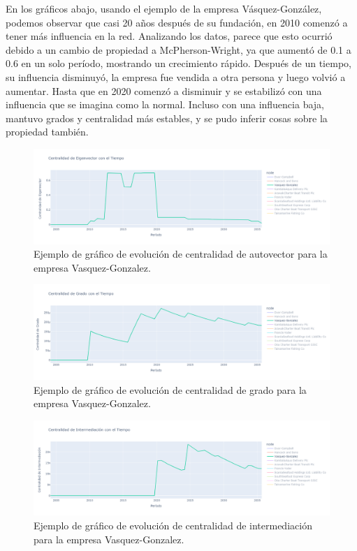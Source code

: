 \documentclass[11pt,spanish,a4paper]{article}
\begin{document}
En los gráficos abajo, usando el ejemplo de la empresa Vásquez-González, podemos observar que casi 20 años después de su fundación, en 2010 comenzó a tener más influencia en la red. Analizando los datos, parece que esto ocurrió debido a un cambio de propiedad a McPherson-Wright, ya que aumentó de 0.1 a 0.6 en un solo período, mostrando un crecimiento rápido. Después de un tiempo, su influencia disminuyó, la empresa fue vendida a otra persona y luego volvió a aumentar. Hasta que en 2020 comenzó a disminuir y se estabilizó con una influencia que se imagina como la normal. Incluso con una influencia baja, mantuvo grados y centralidad más estables, y se pudo inferir cosas sobre la propiedad también.

\begin{figure}[H]
  \centering
  \includegraphics[width=0.7\linewidth]{graphs/eigenvector_centralidad_tiempo_vasquez.png}
  \caption{Ejemplo de gráfico de evolución de centralidad de autovector para la empresa Vasquez-Gonzalez.}
\end{figure}

\begin{figure}[H]
  \centering
  \includegraphics[width=0.7\linewidth]{graphs/grado_centralidad_tiempo_vasquez.png}
  \caption{Ejemplo de gráfico de evolución de centralidad de grado para la empresa Vasquez-Gonzalez.}
\end{figure}

\begin{figure}[H]
  \centering
  \includegraphics[width=0.7\linewidth]{graphs/between_centralidad_tiempo_vasquez.png}
  \caption{Ejemplo de gráfico de evolución de centralidad de intermediación para la empresa Vasquez-Gonzalez.}
\end{figure}
\end{document}

